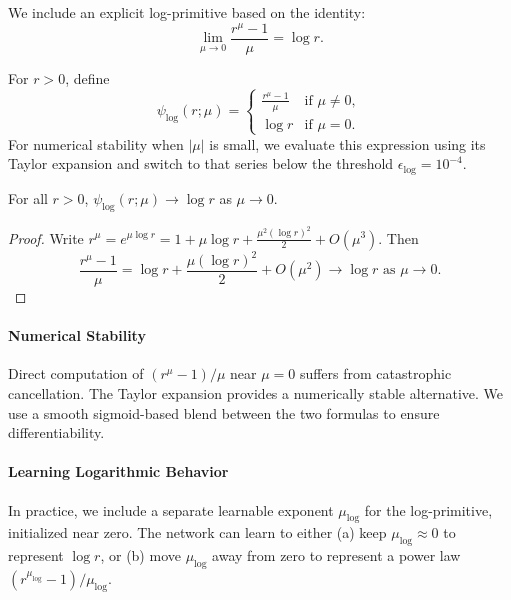 \documentclass[twoside,11pt]{article}
\begin{document}
We include an explicit log-primitive based on the identity:
\begin{equation}
	\lim_{\mu \to 0} \frac{r^\mu - 1}{\mu} = \log r.
	\label{eq:log_primitive_limit}
\end{equation}

\begin{definition}
	\label{def:log_primitive}
	For $r>0$, define
	\begin{equation}
		\psi_{\log}(r; \mu) = \begin{cases}
			\displaystyle \frac{r^\mu - 1}{\mu} & \text{if } \mu \neq 0, \\[8pt]
			\displaystyle \log r                & \text{if } \mu = 0.
		\end{cases}
	\end{equation}
	For numerical stability when $|\mu|$ is small, we evaluate this expression using its Taylor expansion and switch to that series below the threshold $\epsilon_{\log}=10^{-4}$.
\end{definition}

\begin{proposition}
	For all $r > 0$, $\psi_{\log}(r; \mu) \to \log r$ as $\mu \to 0$.
\end{proposition}

\begin{proof}
	Write $r^\mu = e^{\mu \log r} = 1 + \mu \log r + \frac{\mu^2 (\log r)^2}{2} + O(\mu^3)$. Then
	\[
		\frac{r^\mu - 1}{\mu} = \log r + \frac{\mu (\log r)^2}{2} + O(\mu^2) \to \log r \text{ as } \mu \to 0.
	\]
\end{proof}

\paragraph{Numerical Stability} Direct computation of $(r^\mu - 1)/\mu$ near $\mu = 0$ suffers from catastrophic cancellation. The Taylor expansion provides a numerically stable alternative. We use a smooth sigmoid-based blend between the two formulas to ensure differentiability.

\paragraph{Learning Logarithmic Behavior} In practice, we include a separate learnable exponent $\mu_{\log}$ for the log-primitive, initialized near zero. The network can learn to either (a) keep $\mu_{\log} \approx 0$ to represent $\log r$, or (b) move $\mu_{\log}$ away from zero to represent a power law $(r^{\mu_{\log}} - 1)/\mu_{\log}$.
\end{document}
